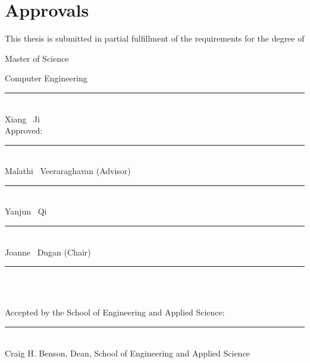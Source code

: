 \newpage
\section*{\centering Approvals}

\thispagestyle{empty}
\begin{center}

This thesis is submitted in partial fulfillment of the
requirements for the degree of

Master of Science

Computer Engineering

\vskip27pt
\rule{3in}{0.01in} \\
Xiang \ Ji \\[27pt]

Approved: \\[35pt]

\parbox[t]{2.75in}{
  \rule{2.75in}{0.01in}\\
  \mbox{}\hfill Malathi \ Veeraraghavan (Advisor)
  \hfill\mbox{}\vspace{0.24in} 
  \rule{2.75in}{0.01in}\\
  \mbox{}\hfill Yanjun \ Qi 
  \hfill\mbox{}\vspace{0.24in} 
} 
\hfill
\parbox[t]{2.75in}{
  \rule{2.75in}{0.01in}\\
  \mbox{}\hfill Joanne \ Dugan (Chair) 
  \hfill\mbox{}\vspace{0.24in} 
  \rule{2.75in}{0.01in}\\
  \mbox{}\hfill 
  \hfill\mbox{}
}\\[27pt]

Accepted by the School of Engineering and Applied Science: \\[27pt]

\rule{3in}{0.01in} \\
Craig H. Benson, Dean, School of Engineering and Applied Science \\[27pt]

\Month \Year
\end{center}
